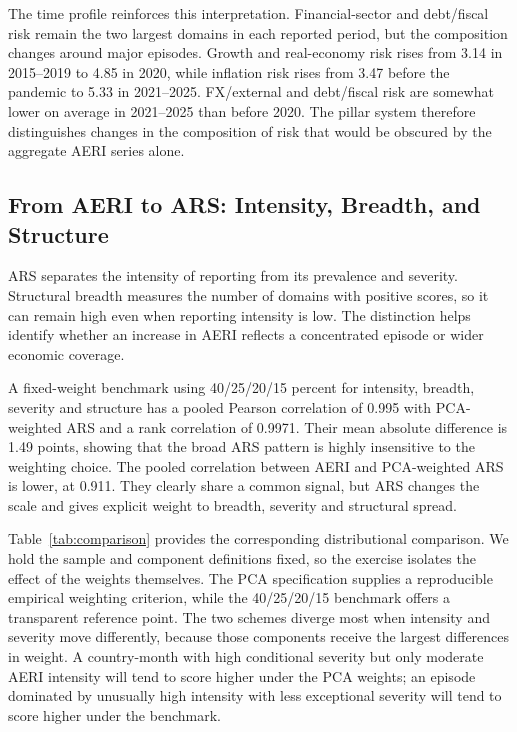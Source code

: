 \documentclass[12pt]{article}
\begin{document}


The time profile reinforces this interpretation. Financial-sector and debt/fiscal risk remain the two largest domains in each reported period, but the composition changes around major episodes. Growth and real-economy risk rises from 3.14 in 2015--2019 to 4.85 in 2020, while inflation risk rises from 3.47 before the pandemic to 5.33 in 2021--2025. FX/external and debt/fiscal risk are somewhat lower on average in 2021--2025 than before 2020. The pillar system therefore distinguishes changes in the composition of risk that would be obscured by the aggregate AERI series alone.
\subsection{From AERI to ARS: Intensity, Breadth, and Structure}\label{sec:aeri_vs_ars}
ARS separates the intensity of reporting from its prevalence and severity. Structural breadth measures the number of domains with positive scores, so it can remain high even when reporting intensity is low. The distinction helps identify whether an increase in AERI reflects a concentrated episode or wider economic coverage.

A fixed-weight benchmark using 40/25/20/15 percent for intensity, breadth, severity and structure has a pooled Pearson correlation of 0.995 with PCA-weighted ARS and a rank correlation of 0.9971. Their mean absolute difference is 1.49 points, showing that the broad ARS pattern is highly insensitive to the weighting choice. The pooled correlation between AERI and PCA-weighted ARS is lower, at 0.911. They clearly share a common signal, but ARS changes the scale and gives explicit weight to breadth, severity and structural spread.

Table~\ref{tab:comparison} provides the corresponding distributional comparison. We hold the sample and component definitions fixed, so the exercise isolates the effect of the weights themselves. The PCA specification supplies a reproducible empirical weighting criterion, while the 40/25/20/15 benchmark offers a transparent reference point. The two schemes diverge most when intensity and severity move differently, because those components receive the largest differences in weight. A country-month with high conditional severity but only moderate AERI intensity will tend to score higher under the PCA weights; an episode dominated by unusually high intensity with less exceptional severity will tend to score higher under the benchmark.
\end{document}

